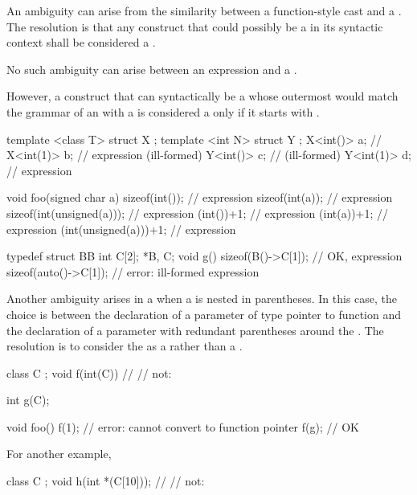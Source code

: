 \pnum
An ambiguity can arise from the similarity between a function-style
cast and a
.
The resolution is that any construct that could possibly be a
in its syntactic context shall be considered a
.
\begin{note}
No such ambiguity can arise between an expression and
a .
\end{note}
However, a construct that can syntactically be a 
whose outermost 
would match the grammar of an 
with a 
is considered a  only if it starts with .
\begin{example}
\begin{codeblock}
template <class T> struct X {};
template <int N> struct Y {};
X<int()> a;                     // 
X<int(1)> b;                    // expression (ill-formed)
Y<int()> c;                     //  (ill-formed)
Y<int(1)> d;                    // expression

void foo(signed char a) {
  sizeof(int());                // expression
  sizeof(int(a));               // expression
  sizeof(int(unsigned(a)));     // expression
  (int())+1;                    // expression
  (int(a))+1;                   // expression
  (int(unsigned(a)))+1;         // expression
}

typedef struct BB { int C[2]; } *B, C;
void g() {
  sizeof(B()->C[1]);            // OK, expression\tcode{)}
  sizeof(auto()->C[1]);         // error: ill-formed expression
}
\end{codeblock}
\end{example}

\pnum
Another ambiguity arises in a
 when a
is nested in parentheses.
In this case, the choice is between the declaration of a parameter of type
pointer to function and the declaration of a parameter with redundant
parentheses around the
.
The resolution is to consider the
as a
rather than a
.
\begin{example}
\begin{codeblock}
class C { };
void f(int(C)) { }              // 
                                // not: 

int g(C);

void foo() {
  f(1);                         // error: cannot convert  to function pointer
  f(g);                         // OK
}
\end{codeblock}

For another example,
\begin{codeblock}
class C { };
void h(int *(C[10]));           // 
                                // not: 
\end{codeblock}
\end{example}


